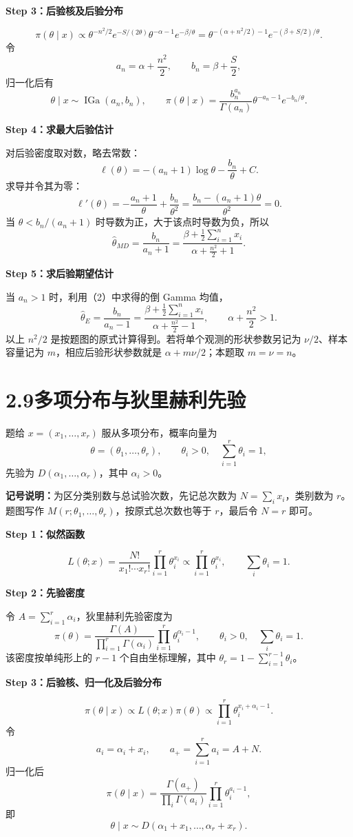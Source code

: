 \documentclass[UTF8,zihao=-4]{ctexart}
\newcommand{\step}[1]{\par\medskip\noindent\textbf{#1}\par\nopagebreak}
\newcommand{\IGa}{\operatorname{IGa}}
\begin{document}
\step{Step 3：后验核及后验分布}
\[
\pi(\theta\mid x)\propto
\theta^{-n^2/2}e^{-S/(2\theta)}\theta^{-\alpha-1}e^{-\beta/\theta}
=\theta^{-(\alpha+n^2/2)-1}e^{-(\beta+S/2)/\theta}.
\]
令
\[
a_n=\alpha+\frac{n^2}{2},\qquad b_n=\beta+\frac S2,
\]
归一化后有
\[
\boxed{\theta\mid x\sim\IGa(a_n,b_n),\qquad
\pi(\theta\mid x)=\frac{b_n^{a_n}}{\Gamma(a_n)}\theta^{-a_n-1}e^{-b_n/\theta}.}
\]

\step{Step 4：求最大后验估计}
对后验密度取对数，略去常数：
\[
\ell(\theta)=-(a_n+1)\log\theta-\frac{b_n}{\theta}+C.
\]
求导并令其为零：
\[
\ell'(\theta)=-\frac{a_n+1}{\theta}+\frac{b_n}{\theta^2}
=\frac{b_n-(a_n+1)\theta}{\theta^2}=0.
\]
当 $\theta<b_n/(a_n+1)$ 时导数为正，大于该点时导数为负，所以
\[
\boxed{\hat\theta_{MD}=\frac{b_n}{a_n+1}
=\frac{\displaystyle\beta+\frac12\sum_{i=1}^n x_i}
{\displaystyle\alpha+\frac{n^2}{2}+1}.}
\]

\step{Step 5：求后验期望估计}
当 $a_n>1$ 时，利用（2）中求得的倒 Gamma 均值，
\[
\boxed{\hat\theta_E=\frac{b_n}{a_n-1}
=\frac{\displaystyle\beta+\frac12\sum_{i=1}^n x_i}
{\displaystyle\alpha+\frac{n^2}{2}-1},\qquad\alpha+\frac{n^2}{2}>1.}
\]
以上 $n^2/2$ 是按题图的原式计算得到。若将单个观测的形状参数另记为 $\nu/2$、样本容量记为 $m$，相应后验形状参数就是 $\alpha+m\nu/2$；本题取 $m=\nu=n$。

\section*{2.9\quad 多项分布与狄里赫利先验}
题给 $x=(x_1,\ldots,x_r)$ 服从多项分布，概率向量为
\[
\theta=(\theta_1,\ldots,\theta_r),\qquad
\theta_i>0,\quad\sum_{i=1}^r\theta_i=1,
\]
先验为 $D(\alpha_1,\ldots,\alpha_r)$，其中 $\alpha_i>0$。

\textbf{记号说明：}为区分类别数与总试验次数，先记总次数为 $N=\sum_i x_i$，类别数为 $r$。题图写作 $M(r;\theta_1,\ldots,\theta_r)$，按原式总次数也等于 $r$，最后令 $N=r$ 即可。

\step{Step 1：似然函数}
\[
L(\theta;x)=\frac{N!}{x_1!\cdots x_r!}
\prod_{i=1}^r\theta_i^{x_i}
\propto\prod_{i=1}^r\theta_i^{x_i},\qquad\sum_i\theta_i=1.
\]

\step{Step 2：先验密度}
令 $A=\sum_{i=1}^r\alpha_i$，狄里赫利先验密度为
\[
\pi(\theta)=\frac{\Gamma(A)}{\prod_{i=1}^r\Gamma(\alpha_i)}
\prod_{i=1}^r\theta_i^{\alpha_i-1},\qquad\theta_i>0,\quad\sum_i\theta_i=1.
\]
该密度按单纯形上的 $r-1$ 个自由坐标理解，其中
$\theta_r=1-\sum_{i=1}^{r-1}\theta_i$。

\step{Step 3：后验核、归一化及后验分布}
\[
\pi(\theta\mid x)\propto L(\theta;x)\pi(\theta)
\propto\prod_{i=1}^r\theta_i^{x_i+\alpha_i-1}.
\]
令
\[
a_i=\alpha_i+x_i,\qquad a_+=\sum_{i=1}^r a_i=A+N.
\]
归一化后
\[
\pi(\theta\mid x)=\frac{\Gamma(a_+)}{\prod_i\Gamma(a_i)}
\prod_{i=1}^r\theta_i^{a_i-1},
\]
即
\[
\boxed{\theta\mid x\sim D(\alpha_1+x_1,\ldots,\alpha_r+x_r).}
\]
\end{document}
